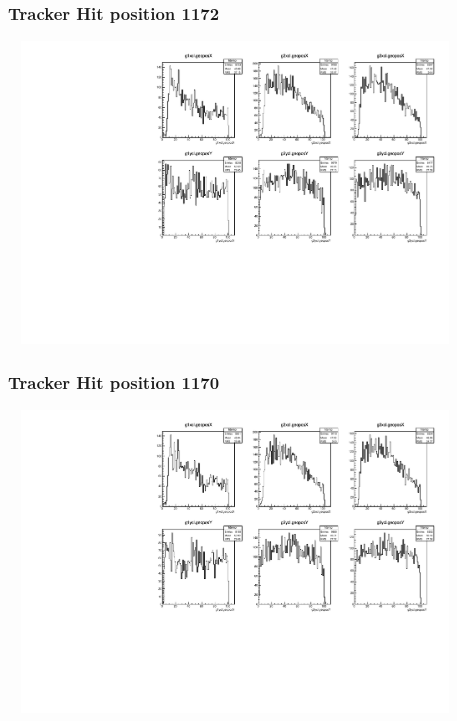 \documentclass[slidestop,compress,mathserif]{beamer}
\begin{document}
\begin{frame}\frametitle{Tracker Hit position 1172}
	 \includegraphics[width=12cm,height=8cm]{Tracker_Hit_position_1172.pdf}
\end{frame}
\begin{frame}\frametitle{Tracker Hit position 1170}
	 \includegraphics[width=12cm,height=8cm]{Tracker_Hit_position_1170.pdf}
\end{frame}
\end{document}
